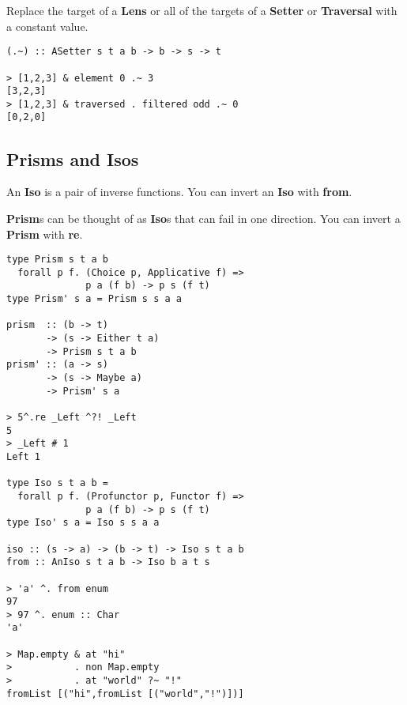 \begin{multicols}{2}
\begin{box1}
Replace the target of a \textbf{Lens} or all of the targets of a
\textbf{Setter} or \textbf{Traversal} with a constant value.

\begin{verbatim}
(.~) :: ASetter s t a b -> b -> s -> t

> [1,2,3] & element 0 .~ 3
[3,2,3]
> [1,2,3] & traversed . filtered odd .~ 0
[0,2,0]
\end{verbatim}
\end{box1}

\begin{box2}
\subsection *{Prisms and Isos}

An \textbf{Iso} is a pair of inverse functions. You can invert an \textbf{Iso} with \textbf{from}.

\textbf{Prism}s can be thought of as \textbf{Iso}s that can fail in one
direction. You can invert a \textbf{Prism} with \textbf{re}.

\begin{verbatim}
type Prism s t a b 
  forall p f. (Choice p, Applicative f) =>
              p a (f b) -> p s (f t)
type Prism' s a = Prism s s a a

prism  :: (b -> t)
       -> (s -> Either t a)
       -> Prism s t a b
prism' :: (a -> s)
       -> (s -> Maybe a)
       -> Prism' s a

> 5^.re _Left ^?! _Left
5
> _Left # 1
Left 1

type Iso s t a b =
  forall p f. (Profunctor p, Functor f) =>
              p a (f b) -> p s (f t)
type Iso' s a = Iso s s a a

iso :: (s -> a) -> (b -> t) -> Iso s t a b
from :: AnIso s t a b -> Iso b a t s

> 'a' ^. from enum
97
> 97 ^. enum :: Char
'a'

> Map.empty & at "hi"
>           . non Map.empty
>           . at "world" ?~ "!"
fromList [("hi",fromList [("world","!")])]
\end{verbatim}

\end{box2}

\end{multicols}

